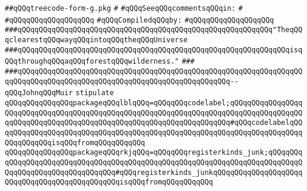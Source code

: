 \label{src/lib/compiler/back/low/treecode/treecode-form-g.pkg}
\verb|##qQQqtreecode-form-g.pkg|\newline
\verb|#|\newline
\verb|#qQQqSeeqQQqcommentsqQQqin:|\newline
\verb|#|\newline
\verb|#qQQqqQQqqQQqqQQqqQQq|\newline
\newline
\verb|#qQQqCompiledqQQqby:|\newline
\verb|#qQQqqQQqqQQqqQQqqQQq|\newline
\newline
\newline
\newline
\verb|###qQQqqQQqqQQqqQQqqQQqqQQqqQQqqQQqqQQqqQQqqQQqqQQqqQQqqQQqqQQq"TheqQQqclearestqQQqwayqQQqintoqQQqtheqQQqUniverse|\newline
\verb|###qQQqqQQqqQQqqQQqqQQqqQQqqQQqqQQqqQQqqQQqqQQqqQQqqQQqqQQqqQQqqQQqisqQQqthroughqQQqaqQQqforestqQQqwilderness."|\newline
\verb|###|\newline
\verb|###qQQqqQQqqQQqqQQqqQQqqQQqqQQqqQQqqQQqqQQqqQQqqQQqqQQqqQQqqQQqqQQqqQQqqQQqqQQqqQQqqQQqqQQqqQQqqQQqqQQqqQQqqQQqqQQqqQQqqQQq--qQQqJohnqQQqMuir|\newline
\newline
\newline
\newline
\verb|stipulate|\newline
\verb|qQQqqQQqqQQqqQQqpackageqQQqlblqQQq=qQQqqQQqcodelabel;qQQqqQQqqQQqqQQqqQQqqQQqqQQqqQQqqQQqqQQqqQQqqQQqqQQqqQQqqQQqqQQqqQQqqQQqqQQqqQQqqQQqqQQqqQQqqQQqqQQqqQQqqQQqqQQqqQQqqQQqqQQqqQQqqQQqqQQqqQQq#qQQqcodelabelqQQqqQQqqQQqqQQqqQQqqQQqqQQqqQQqqQQqqQQqqQQqqQQqqQQqqQQqqQQqqQQqqQQqqQQqqQQqqQQqqQQqisqQQqfromqQQqqQQqqQQq|\newline
\verb|qQQqqQQqqQQqqQQqpackageqQQqrkjqQQq=qQQqqQQqregisterkinds_junk;qQQqqQQqqQQqqQQqqQQqqQQqqQQqqQQqqQQqqQQqqQQqqQQqqQQqqQQqqQQqqQQqqQQqqQQqqQQqqQQqqQQqqQQqqQQqqQQqqQQqqQQq#qQQqregisterkinds_junkqQQqqQQqqQQqqQQqqQQqqQQqqQQqqQQqqQQqqQQqqQQqqQQqisqQQqfromqQQqqQQqqQQq|\newline
